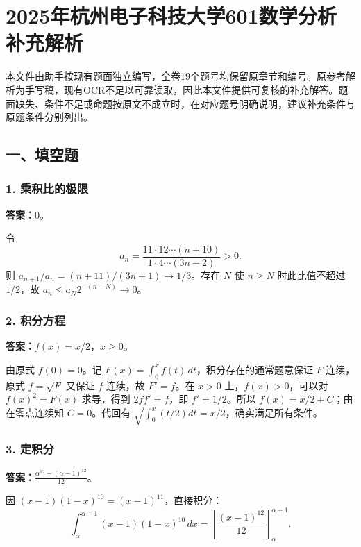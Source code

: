 \documentclass[11pt,fontset=fandol]{ctexart}
\begin{document}
\section{2025年杭州电子科技大学601数学分析补充解析}\label{ux5e74ux676dux5ddeux7535ux5b50ux79d1ux6280ux5927ux5b66601ux6570ux5b66ux5206ux6790ux8865ux5145ux89e3ux6790}

本文件由助手按现有题面独立编写，全卷19个题号均保留原章节和编号。原参考解析为手写稿，现有OCR不足以可靠读取，因此本文件提供可复核的补充解答。题面缺失、条件不足或命题按原文不成立时，在对应题号明确说明，建议补充条件与原题条件分别列出。

\subsection{一、填空题}\label{ux4e00ux586bux7a7aux9898}

\subsubsection{1.
乘积比的极限}\label{ux4e58ux79efux6bd4ux7684ux6781ux9650}

\textbf{答案：}\(0\)。

令 \[
a_n=\frac{11\cdot12\cdots(n+10)}{1\cdot4\cdots(3n-2)}>0.
\] 则 \(a_{n+1}/a_n=(n+11)/(3n+1)\to1/3\)。存在 \(N\) 使 \(n\ge N\)
时此比值不超过 \(1/2\)，故 \(a_n\le a_N2^{-(n-N)}\to0\)。

\subsubsection{2. 积分方程}\label{ux79efux5206ux65b9ux7a0b}

\textbf{答案：}\(\displaystyle f(x)=x/2\)，\(x\ge0\)。

由原式 \(f(0)=0\)。记 \(F(x)=\int_0^xf(t)\,dt\)，积分存在的通常题意保证
\(F\) 连续，原式 \(f=\sqrt F\) 又保证 \(f\) 连续，故 \(F'=f\)。在
\(x>0\) 上，\(f(x)>0\)，可以对 \(f(x)^2=F(x)\) 求导，得到 \(2ff'=f\)，即
\(f'=1/2\)。所以 \(f(x)=x/2+C\)；由在零点连续知 \(C=0\)。代回有
\(\sqrt{\int_0^x(t/2)dt}=x/2\)，确实满足所有条件。

\subsubsection{3. 定积分}\label{ux5b9aux79efux5206}

\textbf{答案：}\(\displaystyle\frac{\alpha^{12}-(\alpha-1)^{12}}{12}\)。

因 \((x-1)(1-x)^{10}=(x-1)^{11}\)，直接积分： \[
\int_\alpha^{\alpha+1}(x-1)(1-x)^{10}\,dx
=\left[\frac{(x-1)^{12}}{12}\right]_\alpha^{\alpha+1}.
\]
\end{document}
